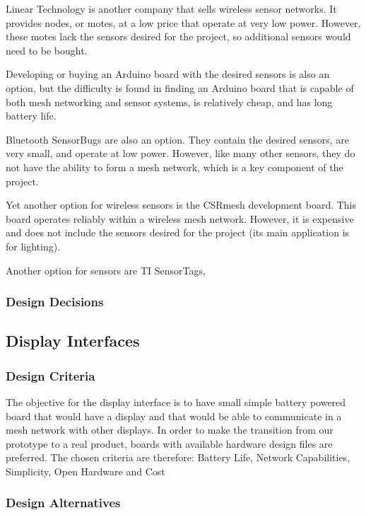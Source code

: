 \documentclass[ppfs.tex]{template/subfiles}
\begin{document}
Linear Technology is another company that sells wireless sensor networks. It provides nodes, or motes, at a low price that operate at very low power. However, these motes lack the sensors desired for the project, so additional sensors would need to be bought. \cite{6}

Developing or buying an Arduino board with the desired sensors is also an option, but the difficulty is found in finding an Arduino board that is capable of both mesh networking and sensor systems, is relatively cheap, and has long battery life. \cite{7} %

Bluetooth SensorBugs are also an option. They contain the desired sensors, are very small, and operate at low power. However, like many other sensors, they do not have the ability to form a mesh network, which is a key component of the project. \cite{8}

Yet another option for wireless sensors is the CSRmesh development board. This board operates reliably within a wireless mesh network. However, it is expensive and does not include the sensors desired for the project (its main application is for lighting). \cite{9}

Another option for sensors are TI SensorTags,

\subsubsection{Design Decisions}

\subsection{Display Interfaces}

\subsubsection{Design Criteria}

The objective for the display interface is to have small simple battery powered board that would have a display and that would be able to communicate in a mesh network with other displays. In order to make the transition from our prototype to a real product, boards with available hardware design files are preferred. The chosen criteria are therefore: Battery Life, Network Capabilities, Simplicity, Open Hardware and Cost

\subsubsection{Design Alternatives}
\end{document}
